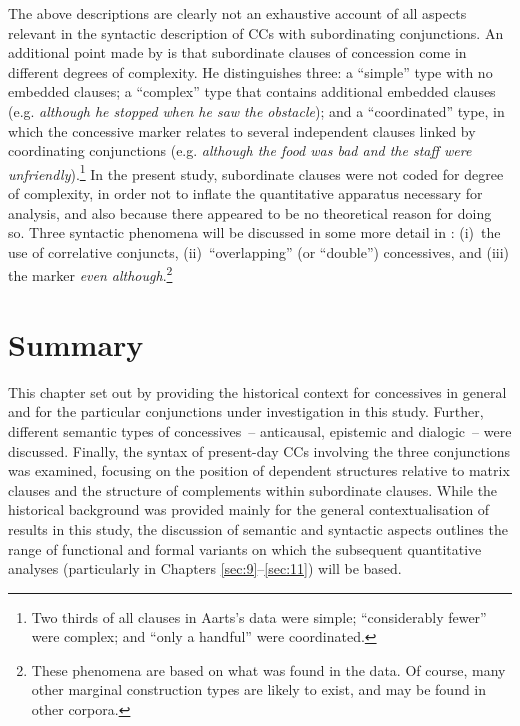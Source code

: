   The above descriptions are clearly not an exhaustive account of all aspects relevant in the syntactic description of CCs with subordinating conjunctions. An additional point made by \citet[41–43]{Aarts1988} is that subordinate clauses of concession come in different degrees of complexity. He distinguishes three: a “simple” type with no embedded clauses; a “complex” type that contains additional embedded clauses (e.g. \textit{although he stopped when he saw the obstacle}); and a “coordinated” type, in which the concessive marker relates to several independent clauses linked by coordinating conjunc\-tions (e.g. \textit{although the food was bad and the staff were unfriendly}).\footnote{Two thirds of all clauses in Aarts’s data were simple; “considerably fewer” were complex; and “only a handful” \citep[43]{Aarts1988} were coordinated.} In the present study, subordinate clauses were not coded for degree of complexity, in order not to inflate the quantitative apparatus necessary for analysis, and also because there appeared to be no theoretical reason for doing so. Three syntactic phenomena will be discussed in some more detail in :
(i)~the use of correlative conjuncts,
(ii)~“overlapping” (or “double”) concessives, and
(iii) the marker \textit{even although}.\footnote{These phenomena are based on what was found in the data. Of course, many other marginal construction types are likely to exist, and may be found in other corpora.}

\section{Summary}\label{sec:2.4}

This chapter set out by providing the historical context for concessives in general and for the particular conjunctions under investigation in this study. Further, different semantic types of concessives~– anticausal, epistemic and dialogic~– were discussed. Finally, the syntax of present-day CCs involving the three conjunctions was examined, focusing on the position of dependent structures relative to matrix clauses and the structure of complements within subordinate clauses. While the historical background was provided mainly for the general contextualisation of results in this study, the discussion of semantic and syntactic aspects outlines the range of functional and formal variants on which the subsequent quantitative analyses (particularly in Chapters \ref{sec:9}–\ref{sec:11}) will be based.

